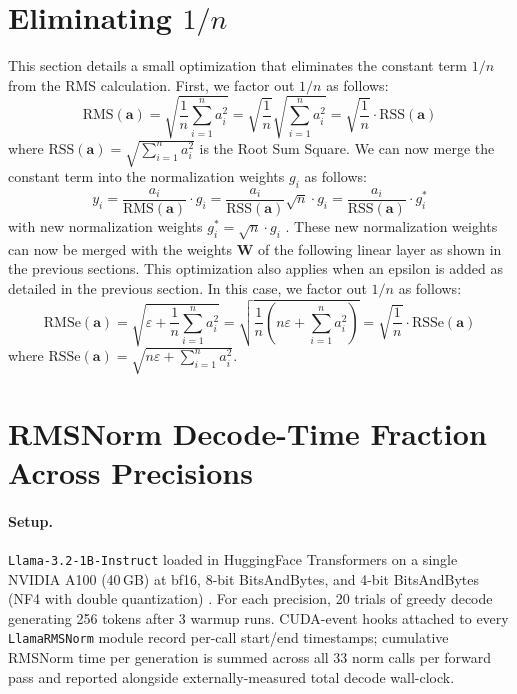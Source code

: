\documentclass{article}
\newcommand{\mat}[1]{\mathbf{#1}}     %
\def\rms{\text{RMS}(\mathbf{a})}      %
\def\f1n{\frac{1}{n}}                 %
\def\sas{\sum_{i=1}^n a_i^2}           %
\def\a{\mathbf{a}}                    %
\begin{document}
\section{Eliminating $1/n$}
This section details a small optimization that eliminates the constant term $1/n$ from the RMS calculation. First, we factor out $1/n$ as follows:
\begin{equation*}
  \rms = \sqrt{\f1n \sas} = \sqrt{\f1n} \sqrt{\sas} = \sqrt{\f1n} \cdot \text{RSS}(\a)
\end{equation*}
where $\text{RSS}(\a) = \sqrt{\sas}$ is the Root Sum Square. We can now merge the constant term into the normalization weights $g_i$ as follows:
\begin{equation*}
  y_i = \frac{a_i}{\rms} \cdot g_i =
  \frac{a_i}{\text{RSS}(\a)} \sqrt{n} \cdot g_i =
  \frac{a_i}{\text{RSS}(\a)}          \cdot g_i^\ast
\end{equation*}
with new normalization weights $g_i^\ast = \sqrt{n} \cdot g_i$ . These new normalization weights can now be merged with the weights $\mat{W}$ of the following linear layer as shown in the previous sections. This optimization also applies when an epsilon is added as detailed in the previous section. In this case, we factor out $1/n$ as follows:
\begin{equation*}
  \text{RMSe}(\a) = \sqrt{\varepsilon + \f1n \sas}
  = \sqrt{\f1n \left( n \varepsilon + \sas \right)}
  = \sqrt{\f1n} \cdot \text{RSSe}(\a)
\end{equation*}
where $\text{RSSe}(\a) = \sqrt{n \varepsilon + \sas}$.

\section{RMSNorm Decode-Time Fraction Across Precisions}\label{app:rmsnorm-fraction}

\paragraph{Setup.} \texttt{Llama-3.2-1B-Instruct} loaded in HuggingFace Transformers on a single NVIDIA A100 (40\,GB) at bf16, 8-bit BitsAndBytes, and 4-bit BitsAndBytes (NF4 with double quantization) \citep{bitsandbytes}. For each precision, 20 trials of greedy decode generating 256 tokens after 3 warmup runs. CUDA-event hooks attached to every \texttt{LlamaRMSNorm} module record per-call start/end timestamps; cumulative RMSNorm time per generation is summed across all 33 norm calls per forward pass and reported alongside externally-measured total decode wall-clock.
\end{document}
